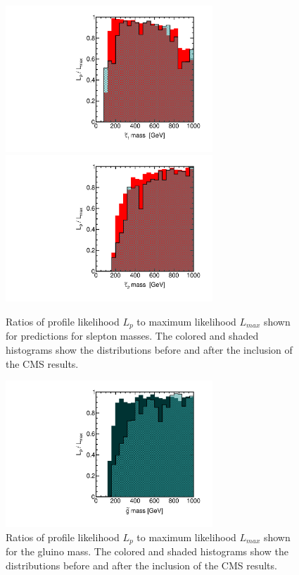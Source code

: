 \begin{figure}[htbp]
\begin{center}
\includegraphics[height=5.5cm]{figs/fig_tau_1.pdf} 
\includegraphics[height=5.5cm]{figs/fig_tau_2.pdf}
\caption{Ratios of profile likelihood $L_p$ to maximum likelihood $L_{max}$ shown for predictions for slepton masses.  The colored and shaded histograms show the distributions before and after the inclusion of the CMS results.}
\label{fig:LRwcms:sl}
\end{center}
\end{figure}

\begin{figure}[htbp]
\begin{center}
\includegraphics[height=5.5cm]{figs/fig_g.pdf} 
\caption{Ratios of profile likelihood $L_p$ to maximum likelihood $L_{max}$ shown for the gluino mass.  The colored and shaded histograms show the distributions before and after the inclusion of the CMS results.}
\label{fig:LRwcms:g}
\end{center}
\end{figure}


